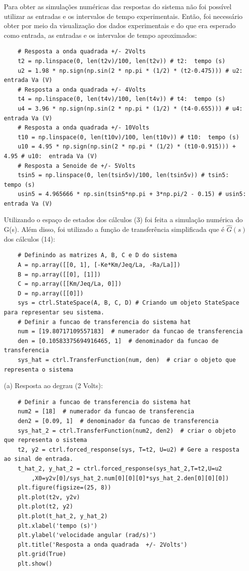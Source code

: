\documentclass[10pt]{article}
\begin{document}
\quad Para obter as simulações numéricas das respostas do sistema não foi possível utilizar as entradas
e os intervalos de tempo experimentais. Então, foi necessário obter por meio da visualização dos dados experimentais e
do que era esperado como entrada, as entradas e os intervalos de tempo aproximados:

\begin{verbatim}
    # Resposta a onda quadrada +/- 2Volts
    t2 = np.linspace(0, len(t2v)/100, len(t2v)) # t2:  tempo (s)
    u2 = 1.98 * np.sign(np.sin(2 * np.pi * (1/2) * (t2-0.475))) # u2:  entrada Va (V)
    # Resposta a onda quadrada +/- 4Volts
    t4 = np.linspace(0, len(t4v)/100, len(t4v)) # t4:  tempo (s)
    u4 = 3.96 * np.sign(np.sin(2 * np.pi * (1/2) * (t4-0.655))) # u4:  entrada Va (V)
    # Resposta a onda quadrada +/- 10Volts
    t10 = np.linspace(0, len(t10v)/100, len(t10v)) # t10:  tempo (s)
    u10 = 4.95 * np.sign(np.sin(2 * np.pi * (1/2) * (t10-0.915))) + 4.95 # u10:  entrada Va (V)
    # Resposta a Senoide de +/- 5Volts 
    tsin5 = np.linspace(0, len(tsin5v)/100, len(tsin5v)) # tsin5:  tempo (s)
    usin5 = 4.965666 * np.sin(tsin5*np.pi + 3*np.pi/2 - 0.15) # usin5:  entrada Va (V)
\end{verbatim}

\quad Utilizando o espaço de estados dos cálculos (3) foi feita a simulação numérica do G(s).
Além disso, foi utilizado a função de transferência simplificada que é $\hat{G}(s)$ dos cálculos (14):

\begin{verbatim}
    # Definindo as matrizes A, B, C e D do sistema
    A = np.array([[0, 1], [-Ke*Km/Jeq/La, -Ra/La]])
    B = np.array([[0], [1]])
    C = np.array([[Km/Jeq/La, 0]])
    D = np.array([[0]])
    sys = ctrl.StateSpace(A, B, C, D) # Criando um objeto StateSpace para representar seu sistema.
    # Definir a funcao de transferencia do sistema hat
    num = [19.80717109557183]  # numerador da funcao de transferencia 
    den = [0.10583375694916465, 1]  # denominador da funcao de transferencia 
    sys_hat = ctrl.TransferFunction(num, den)  # criar o objeto que representa o sistema
\end{verbatim}

(a) Resposta ao degrau (2 Volts):

\begin{verbatim}
    # Definir a funcao de transferencia do sistema hat
    num2 = [18]  # numerador da funcao de transferencia
    den2 = [0.09, 1]  # denominador da funcao de transferencia
    sys_hat_2 = ctrl.TransferFunction(num2, den2)  # criar o objeto que representa o sistema
    t2, y2 = ctrl.forced_response(sys, T=t2, U=u2) # Gere a resposta ao sinal de entrada.
    t_hat_2, y_hat_2 = ctrl.forced_response(sys_hat_2,T=t2,U=u2
        ,X0=y2v[0]/sys_hat_2.num[0][0][0]*sys_hat_2.den[0][0][0])
    plt.figure(figsize=(25, 8))
    plt.plot(t2v, y2v)
    plt.plot(t2, y2)
    plt.plot(t_hat_2, y_hat_2)
    plt.xlabel('tempo (s)')
    plt.ylabel('velocidade angular (rad/s)')
    plt.title('Resposta a onda quadrada  +/- 2Volts')
    plt.grid(True)
    plt.show()
\end{verbatim}
\end{document}
